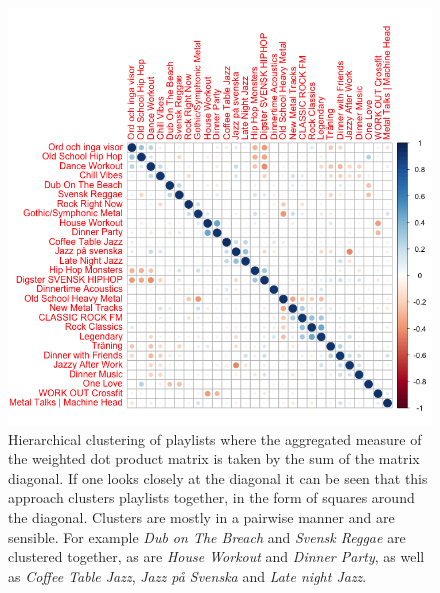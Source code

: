 \documentclass[a4paper,11pt]{kth-mag}
\begin{document}
\begin{figure}
\includegraphics[scale=0.5]{images/sum.png}
\caption{Hierarchical clustering of playlists where the aggregated measure of the weighted dot product matrix is taken by the sum of the matrix diagonal. If one looks closely at the diagonal it can be seen that this approach clusters playlists together, in the form of squares around the diagonal. Clusters are mostly in a pairwise manner and are sensible. For example \textit{Dub on The Breach} and \textit{Svensk Reggae} are clustered together, as are \textit{House Workout} and \textit{Dinner Party}, as well as \textit{Coffee Table Jazz}, \textit{Jazz på Svenska} and \textit{Late night Jazz}.}
\label{sum}
\end{figure}
\end{document}
